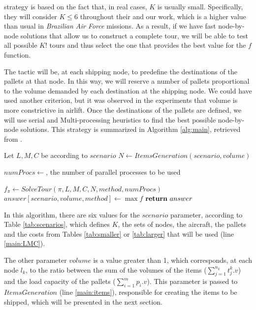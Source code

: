 \documentclass[preprint,authoryear]{elsarticle}
\begin{document}
\cite{MesquitaSanches2023} strategy is based on the fact that, in real cases, $K$\/ is usually small. Specifically, they will consider $K \leq 6$\/ throughout their and our work, which is a higher value than usual in {\it Brazilian Air Force} missions. As a result, if we have fast node-by-node solutions that allow us to construct a complete tour, we will be able to test all possible $K!$\/ tours and thus select the one that provides the best value for the $f$\/ function.

The tactic will be, at each shipping node, to predefine the destinations of the pallets at that node. In this way, we will reserve a number of pallets proportional to the volume demanded by each destination at the shipping node. We could have used another criterion, but it was observed in the experiments that volume is more constrictive in airlift. Once the destinations of the pallets are defined, we will use serial and Multi-processing heuristics to find the best possible node-by-node solutions. This strategy is summarized in Algorithm \ref{alg:main}, retrieved from \cite{MesquitaSanches2023}.


\begin{algorithm}[H]
	\caption{$ACLP+RPDP (scenario,volume)$}  \label{alg:main}
	\begin{algorithmic}[1]
		\State Let $L, M, C$ be according to $scenario$ \label{main:LMC}
		\State $N \gets ItemsGeneration(scenario,volume)$ \label{main:items}
		
			\State $numProcs \gets $, the number of parallel processes to be used
		
			 \label{main:loop1}
				\State $f_{\pi} \gets SolveTour(\pi, L, M, C, N, method, numProcs )$ \label{main:method}
			\EndFor \label{main:loop2}
			\State $answer[scenario,volume,method] \gets \max f$ \label{main:f}
		\EndFor
		\State $ {\bf return}\ answer$
	\end{algorithmic}
\end{algorithm}


In this algorithm, there are six values for the $scenario$\/ parameter, according to Table \ref{tab:scenarios}, which defines $K$, the sets of nodes, the aircraft, the pallets and the costs from Tables \ref{tab:smaller} or \ref{tab:larger} that will be used (line \ref{main:LMC}).


The other parameter $volume$\/ is a value greater than 1, which corresponds, at each node $l_k$, to the ratio between the sum of the volumes of the items ($\sum_{j=1}^{n_k} t^k_j.v$) and the load capacity of the pallets ($\sum_{i=1}^{m} p_i.v$). This parameter is passed to $ItemsGeneration$ (line \ref{main:items}), responsible for creating the items to be shipped, which will be presented in the next section.
\end{document}
